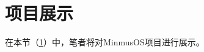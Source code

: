 \section{项目展示}\label{sec:ProjectPresentation}

在本节（\cref{sec:ProjectPresentation}）中，笔者将对MinmusOS项目进行展示。